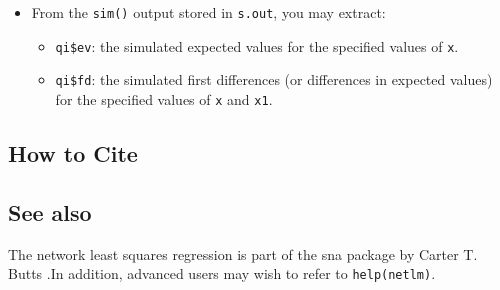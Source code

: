 \begin{itemize}
\item From the {\tt sim()} output stored in {\tt s.out}, you may extract:
\begin{itemize}
\item {\tt qi\$ev}: the simulated expected values for the specified values of {\tt x}.
\item {\tt qi\$fd}: the simulated first differences (or differences in
expected values) for the specified values of {\tt x} and {\tt x1}.
\end{itemize}
\end{itemize}

\subsection* {How to Cite} 



\subsection* {See also}
The network least squares regression is part of the sna package by
Carter T. Butts \citep{ButCar01}.In addition, advanced users may wish to refer to {\tt help(netlm)}.
